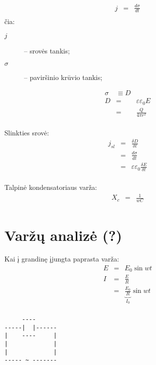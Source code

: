 \begin{align*}
  j &=& \frac{d \sigma}{dt} \\
\end{align*}
čia:
\begin{description}
  \item[$j$] – srovės tankis;
  \item[$\sigma$] – paviršinio krūvio tankis;
\end{description}

\begin{align*}
  \sigma &\equiv D \\
  D
  &=& \varepsilon \varepsilon_{0} E \\
  &=& \frac{Q}{4 \pi r^2} \\
\end{align*}

Slinkties srovė:
\begin{align*}
  j_{sl}
  &=& \frac{\delta D}{\delta t} \\
  &=& \frac{d\sigma}{dt} \\
  &=& \varepsilon \varepsilon_{0} \frac{\delta E}{\delta t} \\
\end{align*}

Talpinė kondensatoriaus varža:
\begin{align*}
  X_{c} &=& \frac{1}{w C} \\
\end{align*}

\section{Varžų analizė (?)}

Kai į grandinę įjungta paprasta varža:
\begin{align*}
  E &=& E_{0} \sin wt \\
  I &=& \frac{E}{R} \\
  &=& \underbrace{\frac{E_{0}}{R}}_{I_{0}} \sin wt \\
\end{align*}
\begin{verbatim}
     ----
-----|  |------
|    ----     |
|             |
|             |
----- ~ -------
\end{verbatim}

